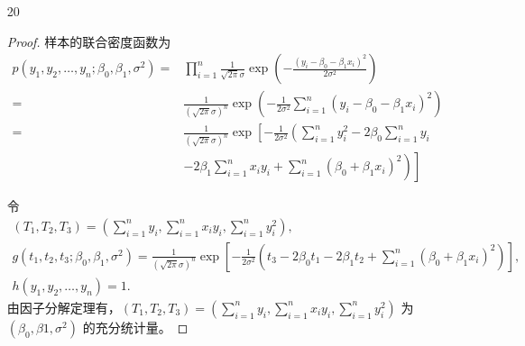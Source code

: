 \documentclass[normal,founder,mtpro2,cn]{elegantnote}
\begin{document}
\begin{enumerate}
\begin{proof}
            由因子分解定理有，$T(x)=\left(\sum_{j=1}^{n}T_{1}\left(x_{j}\right),\ldots,\sum_{j=1}^{n}T_{k}\left(x_{j}\right)\right)$为 $\theta$ 的充分统计量。
        \end{proof}
    \item[20]
        \begin{proof}
            样本的联合密度函数为
            \begin{equation*}
                \begin{aligned}
                    p\left(y_{1},y_{2},\ldots,y_{n};\beta_{0},\beta_{1},\sigma^{2}\right)= & \prod_{i=1}^{n}\frac{1}{\sqrt{2\pi}\sigma}\exp\left(-\frac{\left(y_{i}-\beta_{0}-\beta_{1}x_{i}\right)^{2}}{2\sigma^{2}}\right)            \\
                    =                                                                      & \frac{1}{(\sqrt{2\pi}\sigma)^{n}}\exp\left(-\frac{1}{2\sigma^{2}}\sum_{i=1}^{n}\left(y_{i}-\beta_{0}-\beta_{1}x_{i}\right)^{2}\right)      \\
                    =                                                                      & \frac{1}{(\sqrt{2\pi}\sigma)^{n}}\exp\left[-\frac{1}{2\sigma^{2}}\left(\sum_{i=1}^{n}y_{i}^{2}-2\beta_{0}\sum_{i=1}^{n}y_{i}\right.\right. \\
                                                                                           & \left.\left.-2\beta_{1}\sum_{i=1}^{n}x_{i}y_{i}+\sum_{i=1}^{n}\left(\beta_{0}+\beta_{1}x_{i}\right)^{2}\right)\right]
                \end{aligned}
            \end{equation*}

            令
            \begin{gather*}
                \left(T_{1},T_{2},T_{3}\right)=\left(\sum_{i=1}^{n}y_{i},\sum_{i=1}^{n}x_{i}y_{i},\sum_{i=1}^{n}y_{i}^{2}\right),\\
                g\left(t_{1},t_{2},t_{3};\beta_{0},\beta_{1},\sigma^{2}\right)=\frac{1}{(\sqrt{2\pi}\sigma)^{n}}\exp\left[-\frac{1}{2\sigma^{2}}\left(t_{3}-2\beta_{0}t_{1}-2\beta_{1}t_{2}+\sum_{i=1}^{n}\left(\beta_{0}+\beta_{1}x_{i}\right)^{2}\right)\right],\\
                h\left(y_{1},y_{2},\ldots,y_{n}\right)=1.
            \end{gather*}
            由因子分解定理有，$\left(T_{1},T_{2},T_{3}\right)=\left(\sum_{i=1}^{n}y_{i},\sum_{i=1}^{n}x_{i}y_{i},\sum_{i=1}^{n}y_{i}^{2}\right)$ 为 $\left(\beta_{0},\beta{1},\sigma^{2}\right)$ 的充分统计量。
        \end{proof}
\end{enumerate}
\end{document}
